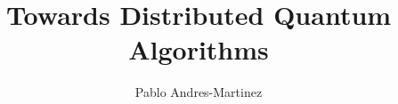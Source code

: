 \documentclass[mscres, lfcs, logo]{infthesis}
\title{Towards Distributed Quantum Algorithms}
\author{Pablo Andres-Martinez}
\begin{document}


\begin{preliminary}

\maketitle

\begin{acknowledgements}
\end{acknowledgements}

\standarddeclaration


\tableofcontents


\end{preliminary}








\appendix







\end{document}
